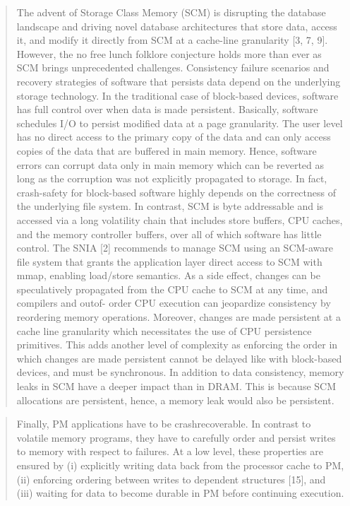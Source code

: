 \begin{quotation}
    The advent of Storage Class Memory (SCM) is disrupting the database
landscape and driving novel database architectures that store data,
access it, and modify it directly from SCM at a cache-line granularity
[3, 7, 9]. However, the no free lunch folklore conjecture
holds more than ever as SCM brings unprecedented challenges. Consistency
failure scenarios and recovery strategies of software that
persists data depend on the underlying storage technology. In the
traditional case of block-based devices, software has full control
over when data is made persistent. Basically, software schedules I/O
to persist modified data at a page granularity. The user level has no
direct access to the primary copy of the data and can only access
copies of the data that are buffered in main memory. Hence, software
errors can corrupt data only in main memory which can be reverted
as long as the corruption was not explicitly propagated to storage.
In fact, crash-safety for block-based software highly depends on the
correctness of the underlying file system. In contrast, SCM is byte addressable
and is accessed via a long volatility chain that includes
store buffers, CPU caches, and the memory controller buffers, over
all of which software has little control. The SNIA [2] recommends
to manage SCM using an SCM-aware file system that grants the application
layer direct access to SCM with mmap, enabling load/store
semantics. As a side effect, changes can be speculatively propagated
from the CPU cache to SCM at any time, and compilers and outof-
order CPU execution can jeopardize consistency by reordering
memory operations. Moreover, changes are made persistent at a
cache line granularity which necessitates the use of CPU persistence
primitives. This adds another level of complexity as enforcing the
order in which changes are made persistent cannot be delayed like
with block-based devices, and must be synchronous. In addition to
data consistency, memory leaks in SCM have a deeper impact than
in DRAM. This is because SCM allocations are persistent, hence, a
memory leak would also be persistent.\cite{oukid2016testing}
\end{quotation}

\begin{quotation}
    Finally, PM applications have to be crashrecoverable.
In contrast to volatile memory programs, they
have to carefully order and persist writes to memory with
respect to failures. At a low level, these properties are ensured
by (i) explicitly writing data back from the processor
cache to PM, (ii) enforcing ordering between writes to dependent
structures [15], and (iii) waiting for data to become
durable in PM before continuing execution.\cite{Nalli:2017:APM:3093337.3037730}
\end{quotation}

